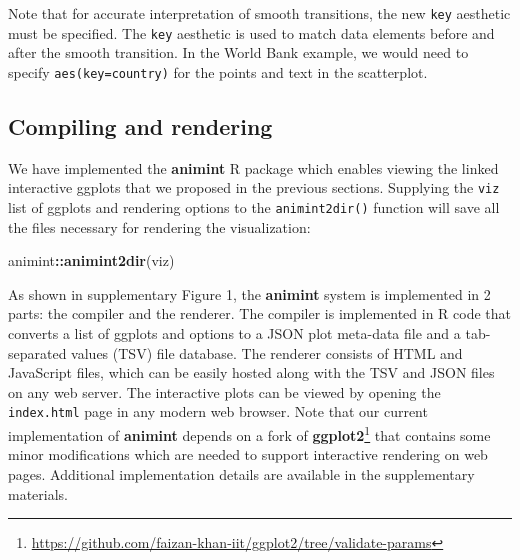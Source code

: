\documentclass[12pt,]{article}
\newenvironment{Shaded}{\begin{snugshade}}{\end{snugshade}}
\newcommand{\DataTypeTok}[1]{\textcolor[rgb]{0.13,0.29,0.53}{#1}}
\newcommand{\DecValTok}[1]{\textcolor[rgb]{0.00,0.00,0.81}{#1}}
\newcommand{\KeywordTok}[1]{\textcolor[rgb]{0.13,0.29,0.53}{\textbf{#1}}}
\newcommand{\NormalTok}[1]{#1}
\newcommand{\OperatorTok}[1]{\textcolor[rgb]{0.81,0.36,0.00}{\textbf{#1}}}
\newcommand{\StringTok}[1]{\textcolor[rgb]{0.31,0.60,0.02}{#1}}
\let\rmarkdownfootnote\footnote%
\def\footnote{\protect\rmarkdownfootnote}
\theoremstyle{definition}
\theoremstyle{definition}
\theoremstyle{definition}
\theoremstyle{remark}
\begin{document}
\begin{Shaded}
\end{Shaded}

Note that for accurate interpretation of smooth transitions, the new
\texttt{key} aesthetic must be specified. The \texttt{key} aesthetic is
used to match data elements before and after the smooth transition. In
the World Bank example, we would need to specify
\texttt{aes(key=country)} for the points and text in the scatterplot.

\hypertarget{compiling-and-rendering}{%
\subsection{Compiling and rendering}\label{compiling-and-rendering}}

We have implemented the \textbf{animint} R package which enables viewing
the linked interactive ggplots that we proposed in the previous
sections. Supplying the \texttt{viz} list of ggplots and rendering
options to the \texttt{animint2dir()} function will save all the files
necessary for rendering the visualization:

\begin{Shaded}
\begin{Highlighting}[]
\NormalTok{animint}\OperatorTok{::}\KeywordTok{animint2dir}\NormalTok{(viz)}
\end{Highlighting}
\end{Shaded}

As shown in supplementary Figure 1, the \textbf{animint} system is
implemented in 2 parts: the compiler and the renderer. The compiler is
implemented in R code that converts a list of ggplots and options to a
JSON plot meta-data file and a tab-separated values (TSV) file database.
The renderer consists of HTML and JavaScript files, which can be easily
hosted along with the TSV and JSON files on any web server. The
interactive plots can be viewed by opening the \texttt{index.html} page
in any modern web browser. Note that our current implementation of
\textbf{animint} depends on a fork of
\textbf{ggplot2}\footnote{\url{https://github.com/faizan-khan-iit/ggplot2/tree/validate-params}}
that contains some minor modifications which are needed to support
interactive rendering on web pages. Additional implementation details
are available in the supplementary materials.
\end{document}
